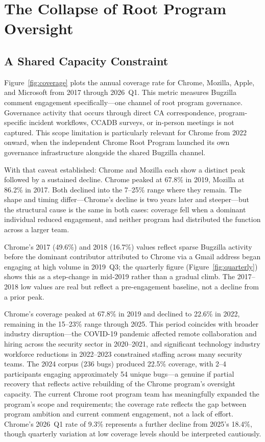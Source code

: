 \documentclass[10pt,twocolumn,letterpaper]{article}
\begin{document}
\section{The Collapse of Root Program Oversight}
\label{sec:oversight}

\subsection{A Shared Capacity Constraint}
\label{sec:coverage}

Figure~\ref{fig:coverage} plots the annual coverage rate for Chrome,
Mozilla, Apple, and Microsoft from 2017 through 2026~Q1. This metric
measures Bugzilla comment engagement specifically---one channel of root
program governance. Governance activity that occurs through direct CA
correspondence, program-specific incident workflows, CCADB surveys, or
in-person meetings is not captured. This scope limitation is particularly
relevant for Chrome from 2022 onward, when the independent Chrome Root
Program launched its own governance infrastructure alongside the
shared Bugzilla channel.

With that caveat established: Chrome and Mozilla each show a distinct
peak followed by a sustained decline. Chrome peaked at 67.8\% in 2019,
Mozilla at 86.2\% in 2017. Both declined into the 7--25\% range where
they remain. The shape and timing differ---Chrome's decline is two years
later and steeper---but the structural cause is the same in both cases:
coverage fell when a dominant individual reduced engagement, and neither
program had distributed the function across a larger team.

Chrome's 2017 (49.6\%) and 2018 (16.7\%) values reflect sparse Bugzilla
activity before the dominant contributor attributed to Chrome via a Gmail
address began engaging at high volume in 2019~Q3; the quarterly figure
(Figure~\ref{fig:quarterly}) shows this as a step-change in mid-2019
rather than a gradual climb. The 2017--2018 low values are real but
reflect a pre-engagement baseline, not a decline from a prior peak.

Chrome's coverage peaked at 67.8\% in 2019 and declined to 22.6\% in 2022,
remaining in the 15--23\% range through 2025. This period coincides with
broader industry disruption---the COVID-19 pandemic affected remote
collaboration and hiring across the security sector in 2020--2021, and
significant technology industry workforce reductions in 2022--2023
constrained staffing across many security teams. The 2024 corpus (236 bugs)
produced 22.5\% coverage, with 2--4 participants engaging approximately
54 unique bugs---a genuine if partial recovery that reflects active
rebuilding of the Chrome program's oversight capacity. The current Chrome
root program team has meaningfully expanded the program's scope and
requirements; the coverage rate reflects the gap between program ambition
and current comment engagement, not a lack of effort. Chrome's 2026~Q1
rate of 9.3\% represents a further decline from 2025's 18.4\%, though
quarterly variation at low coverage levels should be interpreted
cautiously.
\end{document}
